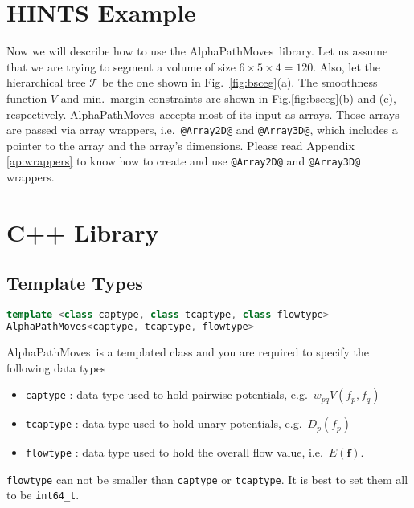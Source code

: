 \documentclass[12pt,letterpaper]{article}
\makeatletter
\def\APM{{\ttfamily AlphaPathMoves}~}
\def\Tree{\mathcal{T}}
\def\labelvars{\mathbf{f}}
\def\labelvar{f}
\def\Tree{\mathcal{T}}
\def\unary{D}
\def\keyhl[#1]{\lstinline{@#1@}}
\makeatother
\begin{document}
\section{HINTS Example}
Now we will describe how to use the \APM library. Let us assume that we are trying to segment a volume of size $6\times 5 \times 4= 120.$ Also, let the hierarchical tree $\Tree$ be the one shown in Fig.~\ref{fig:bsceg}(a). The smoothness function $V$ and min.~margin constraints are shown in Fig.\ref{fig:bsceg}(b) and (c), respectively. \APM accepts most of its input as arrays. Those arrays are passed via array wrappers, i.e.~\keyhl[Array2D] and \keyhl[Array3D], which includes a pointer to the array and the array's dimensions. Please read Appendix \ref{ap:wrappers} to know how to create and use \keyhl[Array2D] and \keyhl[Array3D] wrappers.



\section{C++ Library}
\subsection{Template Types}
\label{sc:tempaltedclass}
\begin{lstlisting}[language=C++]
template <class captype, class tcaptype, class flowtype>
AlphaPathMoves<captype, tcaptype, flowtype>
\end{lstlisting}
\APM is a templated class and you are required to specify the following data types
\begin{itemize}
\item  \lstinline{captype} \phantom{X}: data type used to hold pairwise potentials, e.g.~$w_{pq}V(\labelvar_p,\labelvar_q)$
\item  \lstinline{tcaptype} : data type used to hold unary potentials, e.g.~$\unary_p(\labelvar_p)$
\item  \lstinline{flowtype} : data type used to hold the overall flow value, i.e.~$E(\labelvars).$
\end{itemize}
\begin{tcolorbox}
\lstinline{flowtype} can not be smaller than \lstinline{captype} or \lstinline{tcaptype}. It is best to set them all to be \lstinline{int64_t}.
\end{tcolorbox}
\end{document}
